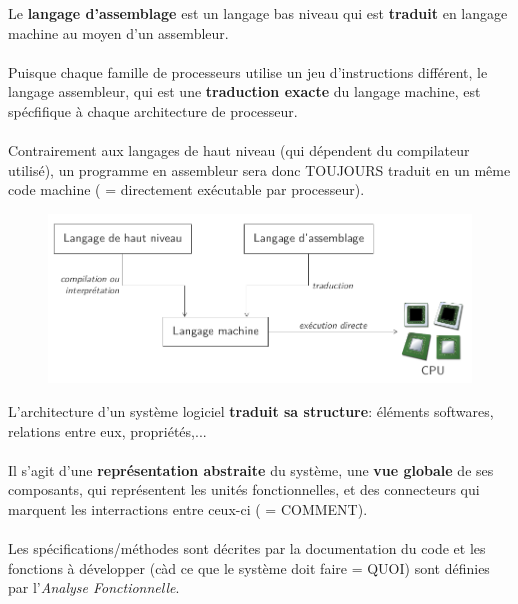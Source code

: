 \item{}
{\vrai}
{Le \textbf{langage d'assemblage} est un langage bas niveau qui est \textbf{traduit} en langage machine au moyen d'un assembleur.
\paragraph{}
Puisque chaque famille de processeurs utilise un jeu d'instructions différent, le langage assembleur, qui est une \textbf{traduction exacte} du langage machine, est spécfifique à chaque architecture de processeur.
\paragraph{}
Contrairement aux langages de haut niveau (qui dépendent du compilateur utilisé), un programme en assembleur sera donc TOUJOURS traduit en un même code machine ( = directement exécutable par processeur).

\begin{figure}[h!]
\center
\includegraphics[scale=.3]{images/niveaux-langages}
\end{figure}
}


\item{}
{\faux}
{L'architecture d'un système logiciel \textbf{traduit sa structure}: éléments softwares, relations entre eux, propriétés,...
\paragraph{}
Il s'agit d'une \textbf{représentation abstraite} du système, une \textbf{vue globale} de ses composants, qui représentent les unités fonctionnelles, et des connecteurs qui marquent les interractions entre ceux-ci ( = COMMENT).
\paragraph{}
Les spécifications/méthodes sont décrites par la documentation du code et les fonctions à développer (càd ce que le système doit faire = QUOI) sont définies par l'\textit{Analyse Fonctionnelle}.
}


